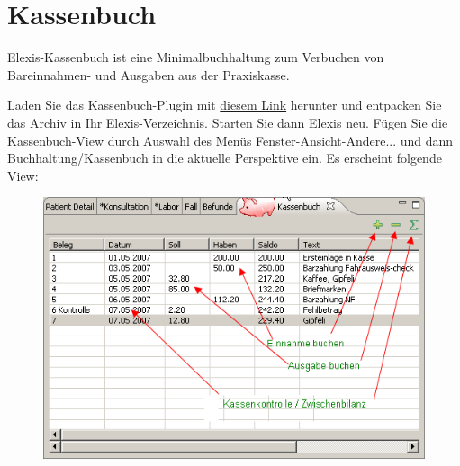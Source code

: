 
\section{Kassenbuch}%
Elexis-Kassenbuch ist eine Minimalbuchhaltung zum Verbuchen von Bareinnahmen- und Ausgaben aus der Praxiskasse.

 Laden Sie das Kassenbuch-Plugin mit \href{http://www.rgw.ch/download.php?file=elexis-kassenbuch}{diesem Link} herunter und entpacken Sie das Archiv in Ihr Elexis-Verzeichnis. Starten Sie dann Elexis neu.
Fügen Sie die Kassenbuch-View durch Auswahl des Menüs Fenster-Ansicht-Andere... und dann Buchhaltung/Kassenbuch in die aktuelle Perspektive ein. Es erscheint folgende View:
\begin{figure}[htp]
\begin{center}
  \includegraphics{images/kassenbuch}
  \label{fig:kassenbuch}
\end{center}
\end{figure}

